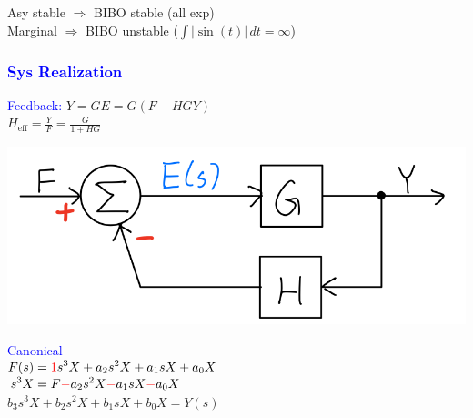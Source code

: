\documentclass[4pt]{article}
\theoremstyle{definition}
\theoremstyle{definition}
\newcommand{\red}[1]{\textcolor{red}{#1}}
\newcommand{\blue}[1]{\textcolor{blue}{#1}}
\begin{document}
\begin{landscape}
\begin{multicols}{3}
    Asy stable $\Rightarrow$ BIBO stable (all exp)\\                                %
    Marginal $\Rightarrow$ BIBO unstable ($\int |\sin(t)| \, dt = \infty$)                            %

\subsubsection*{\blue{Sys Realization}}         %
    \blue{Feedback:} \(Y = GE = G(F - HGY)\)\\
    \(H_{\text{eff}} = \frac{Y} F = \frac G {1+HG}\)

    \includegraphics[width=0.5\linewidth]{figures/feedback.png}

    \blue{Canonical}\\
    \(
    \setlength{\jot}{0pt} 
    \begin{aligned}    
        F(s) &= \red{1} s^3 X + a_2s^2 X + a_1 sX + a_0 X\\      
        s^3 X &= F \red - a_2 s^2 X \red - a_1 sX \red - a_0 X         
    \end{aligned}
    \)\\
    \(b_3 s^3 X + b_2 s^2 X + b_1 sX + b_0 X = Y(s)\)


\end{multicols}
\end{landscape}
\end{document}
